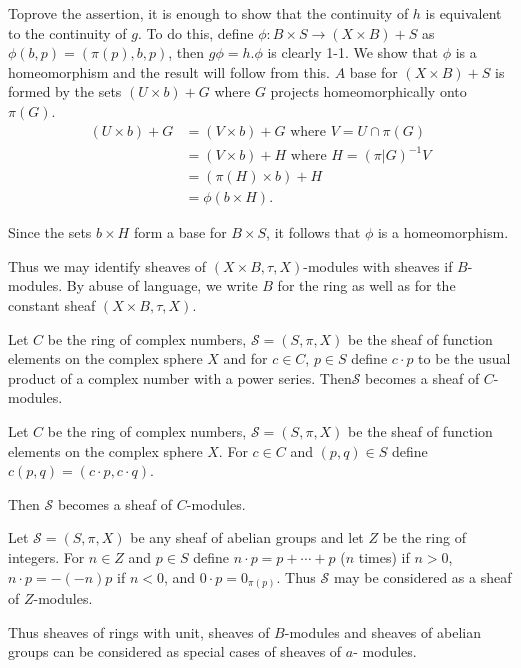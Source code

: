 \medskip
To\pageoriginale prove the assertion, it is enough to show that the continuity of
$h$ is equivalent to the continuity of $g$. To do this, define $\phi
: B \times S \to (X \times B)+S$ as $\phi (b,p)= (\pi(p), b,p)$, then
$g \phi =h. \phi$ is clearly 1-1. We show that $\phi$ is a
homeomorphism and the result will follow from this. $A$ base for $(X
\times B)+S$ is formed by the sets $(U \times b)+G$ where $G$ projects
homeomorphically onto $\pi (G)$. 
\begin{align*}
(U \times b)+G& = (V \times b)+G \text{ where } V = U \cap \pi(G)\\
& = (V \times b)+H \text{ where } H= (\pi |G)^{-1}V\\
& = (\pi (H) \times b) +H\\
&= \phi (b \times H).
\end{align*}

\noindent
Since the sets $b \times H$ form a base for $B \times S$, it follows
that $\phi$ is a homeomorphism. 

Thus we may identify sheaves of $(X \times B, \tau, X)$-modules with
sheaves if  $B$-modules. By abuse of language, we write $B$ for the ring as
well as for the constant  sheaf $(X \times B, \tau, X)$. 

\begin{exam}%
Let $C$ be the ring of complex numbers, $\mathscr{S}=(S, \pi , X)$ be
the sheaf of function elements on the complex sphere $X$ and for $c
\in C$, $p \in S$ define $c \cdot p$ to be the usual product of a complex
number with a power series. Then\pageoriginale $\mathscr{S}$ becomes a
sheaf of $C$- 
modules. 
\end{exam}

\begin{exam}%
Let  $C$ be the ring of complex numbers, $\mathscr{S}=(S, \pi , X)$ be
the sheaf of function elements on the complex sphere $X$. For $c \in C$
and $(p,q) \in S$ define $c(p,q)= (c \cdot p, c \cdot q)$. 
\end{exam}

\noindent
Then $\mathscr{S}$ becomes a sheaf of $C$-modules. 

\begin{exam}%
Let $\mathscr{S}=(S, \pi , X)$ be any sheaf of abelian groups and let
$Z$ be the ring of integers. For $n \in Z$ and $p \in S$ define
$n\cdot p=p+ \cdots +p$ ($n$ times) if $n>0$, $n\cdot p=-(-n)p$ if $n<0$, and
$0 \cdot p= 0_{\pi (p)}$. Thus $\mathscr{S}$ may be considered as a
sheaf of $Z$-modules.  
\end{exam}

Thus sheaves of rings with unit, sheaves of $B$-modules and sheaves of
abelian groups can be considered as special cases of sheaves of $a$-
modules. 
